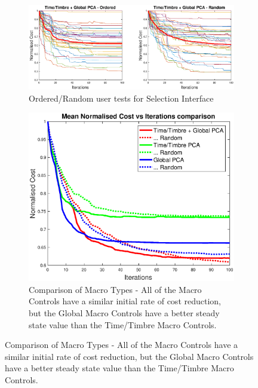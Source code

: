 \documentclass[11pt, oneside]{report}   	%
\begin{document}
\begin{figure}
	\caption{Perfect/Imperfect user tests for Selection Interface}
	\begin{subfigure}[b]{\textwidth}
\hspace{-60pt}
	\includegraphics[width = 8in]{PCAInterfaceTests1.eps}
	\vspace{-10pt}
	\caption{Ordered/Random user tests for Selection Interface}
	\label{fig:PCAtest1}
\end{subfigure}

\begin{subfigure}[b]{\textwidth}
	\centering
	\includegraphics[width = \textwidth]{PCAInterfaceTests2.eps}
	\caption{Comparison of Macro Types - All of the Macro Controls have a similar initial rate of cost reduction, but the Global Macro Controls have a better steady state value than the Time/Timbre Macro Controls.}
	\label{fig:PCAtest2}
\end{subfigure}
\end{figure}
\end{document}
